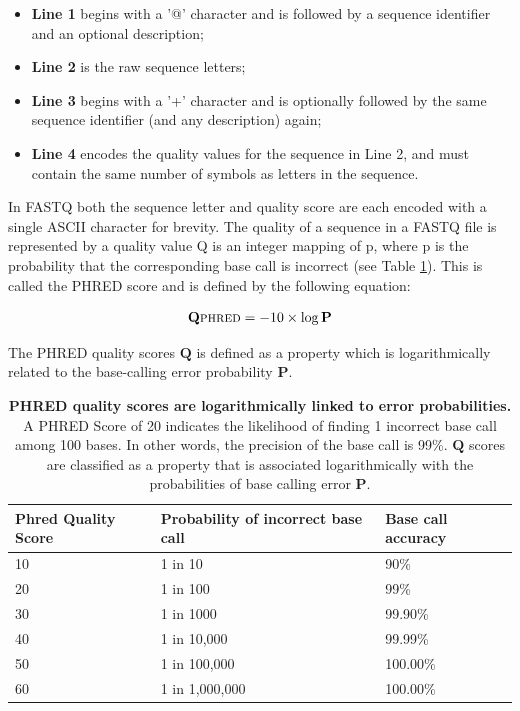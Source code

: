 \begin{itemize}
    \item \textbf{Line 1} begins with a '@' character and is followed by a sequence identifier and an optional description;
    \item \textbf{Line 2} is the raw sequence letters;
    \item \textbf{Line 3} begins with a '+' character and is optionally followed by the same sequence identifier (and any description) again;
    \item \textbf{Line 4} encodes the quality values for the sequence in Line 2, and must contain the same number of symbols as letters in the sequence.
\end{itemize}

In FASTQ both the sequence letter and quality score are each encoded with a single ASCII character for brevity. The quality of a sequence in a FASTQ file is represented by a quality value Q is an integer mapping of p, where p is the probability that the corresponding base call is incorrect (see Table \ref{tab:phred_error}). This is called the PHRED score \citep{ewing_base-calling_1998} and is defined by the following equation:

\begin{equation}
\centering
\mathbf{Q}\textsc{phred} = - 10 \times \log \mathbf{P}
\end{equation}
 
The PHRED quality scores $\mathbf{Q}$ is defined as a property which is logarithmically related to the base-calling error probability $\mathbf{P}$.

\begin{table}[h!]
\caption{\textbf{PHRED quality scores are logarithmically linked to error probabilities.} A PHRED Score of 20 indicates the likelihood of finding 1 incorrect base call among 100 bases. In other words, the precision of the base call is 99\%. $\mathbf{Q}$ scores are classified as a property that is associated logarithmically with the probabilities of base calling error $\mathbf{P}$.} \label{tab:phred_error}
\begin{tabular}{@{}lll@{}}
\toprule
\textbf{Phred Quality Score} & \textbf{Probability of incorrect base call} & \textbf{Base call accuracy} \\ \midrule
10 & 1 in 10        & 90\%     \\
20 & 1 in 100       & 99\%     \\
30 & 1 in 1000      & 99.90\%  \\
40 & 1 in 10,000    & 99.99\%  \\
50 & 1 in 100,000   & 100.00\% \\
60 & 1 in 1,000,000 & 100.00\% \\ \bottomrule
\end{tabular}
\end{table}

